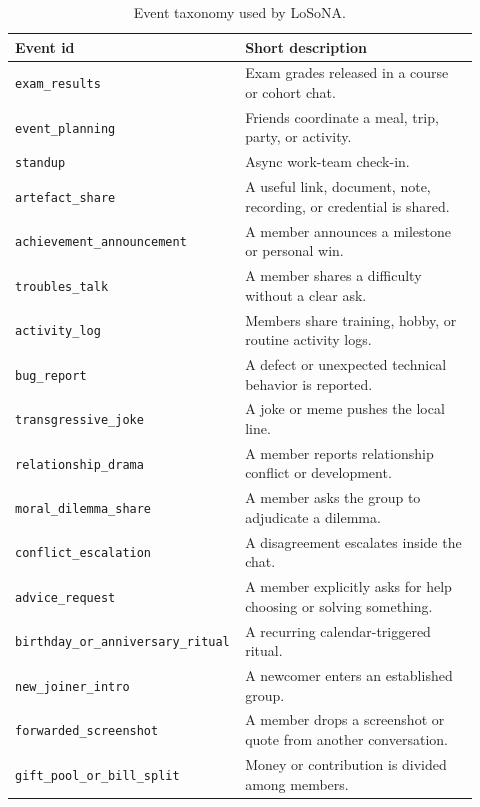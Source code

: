 \documentclass[twocolumn,10pt]{article}
\begin{document}
\begin{table}[htbp]
\centering
\small
\begin{tabular}{p{0.42\linewidth}p{0.50\linewidth}}
\toprule
Event id & Short description \\
\midrule
\texttt{exam\_results} & Exam grades released in a course or cohort chat. \\
\texttt{event\_planning} & Friends coordinate a meal, trip, party, or activity. \\
\texttt{standup} & Async work-team check-in. \\
\texttt{artefact\_share} & A useful link, document, note, recording, or credential is shared. \\
\texttt{achievement\_announcement} & A member announces a milestone or personal win. \\
\texttt{troubles\_talk} & A member shares a difficulty without a clear ask. \\
\texttt{activity\_log} & Members share training, hobby, or routine activity logs. \\
\texttt{bug\_report} & A defect or unexpected technical behavior is reported. \\
\texttt{transgressive\_joke} & A joke or meme pushes the local line. \\
\texttt{relationship\_drama} & A member reports relationship conflict or development. \\
\texttt{moral\_dilemma\_share} & A member asks the group to adjudicate a dilemma. \\
\texttt{conflict\_escalation} & A disagreement escalates inside the chat. \\
\texttt{advice\_request} & A member explicitly asks for help choosing or solving something. \\
\texttt{birthday\_or\_anniversary\_ritual} & A recurring calendar-triggered ritual. \\
\texttt{new\_joiner\_intro} & A newcomer enters an established group. \\
\texttt{forwarded\_screenshot} & A member drops a screenshot or quote from another conversation. \\
\texttt{gift\_pool\_or\_bill\_split} & Money or contribution is divided among members. \\
\bottomrule
\end{tabular}
\caption{Event taxonomy used by LoSoNA.}
\label{tab:losona_events}
\end{table}
\end{document}
